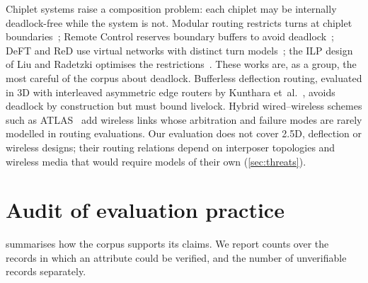 Chiplet systems raise a composition problem: each chiplet may be internally deadlock-free while the system is not. Modular routing restricts turns at chiplet boundaries~\cite{yin2018modular}; Remote Control reserves boundary buffers to avoid deadlock~\cite{majumder2021remote}; DeFT and ReD use virtual networks with distinct turn models~\cite{taheri2022deft,taheri2024red}; the ILP design of Liu and Radetzki optimises the restrictions~\cite{liu2024ilp}. These works are, as a group, the most careful of the corpus about deadlock. Bufferless deflection routing, evaluated in 3D with interleaved asymmetric edge routers by Kunthara et~al.~\cite{kunthara2021edge}, avoids deadlock by construction but must bound livelock. Hybrid wired--wireless schemes such as ATLAS~\cite{singh2026atlas} add wireless links whose arbitration and failure modes are rarely modelled in routing evaluations. Our evaluation does not cover 2.5D, deflection or wireless designs; their routing relations depend on interposer topologies and wireless media that would require models of their own (\cref{sec:threats}).

\section{Audit of evaluation practice}
\label{sec:practice}

 summarises how the corpus supports its claims. We report counts over the records in which an attribute could be verified, and the number of unverifiable records separately.


